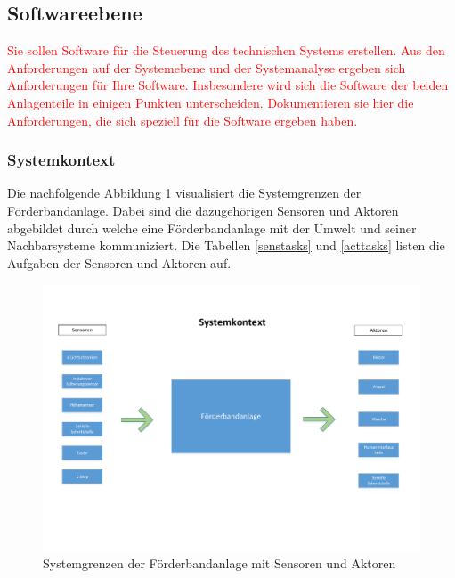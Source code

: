 \documentclass[a4paper, 11pt]{article}
\begin{document}
\subsection{Softwareebene}
\textcolor{red}{Sie sollen Software für die Steuerung des technischen Systems erstellen. Aus den Anforderungen auf der Systemebene und der Systemanalyse ergeben sich Anforderungen für Ihre Software. Insbesondere wird sich die Software der beiden Anlagenteile in einigen Punkten unterscheiden. Dokumentieren sie hier die Anforderungen, die sich speziell für die Software ergeben haben.}

\newpage

\subsubsection{Systemkontext}
Die nachfolgende Abbildung \ref{syskont} visualisiert die Systemgrenzen der Förderbandanlage. Dabei sind die dazugehörigen Sensoren und Aktoren abgebildet durch welche eine Förderbandanlage mit der Umwelt und seiner Nachbarsysteme kommuniziert. Die Tabellen \ref{senstasks} und \ref{acttasks} listen die Aufgaben der Sensoren und Aktoren auf.

\begin{figure}[h]
\centering 
\includegraphics[scale=0.6]{images/Systemkontext.pdf}
\caption{Systemgrenzen der Förderbandanlage mit Sensoren und Aktoren}
\label{syskont}
\end{figure}
\end{document}

